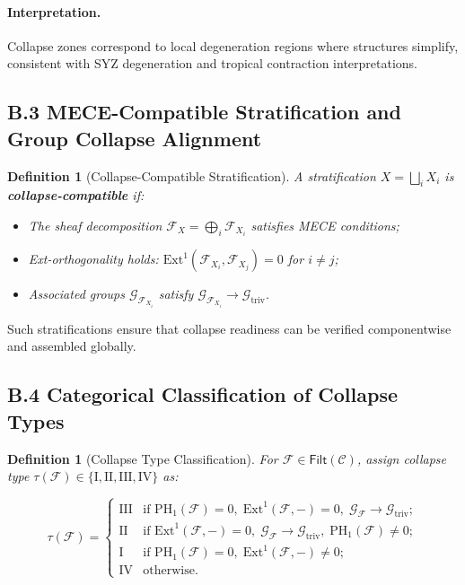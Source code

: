 \documentclass[11pt]{article}
\newtheorem{definition}[theorem]{Definition}
\begin{document}
\paragraph{Interpretation.}
Collapse zones correspond to local degeneration regions where structures simplify, consistent with SYZ degeneration and tropical contraction interpretations.

\subsection*{B.3 MECE-Compatible Stratification and Group Collapse Alignment}

\begin{definition}[Collapse-Compatible Stratification]
A stratification \( X = \bigsqcup_i X_i \) is \textbf{collapse-compatible} if:

\begin{itemize}
    \item The sheaf decomposition \( \mathcal{F}_X = \bigoplus_i \mathcal{F}_{X_i} \) satisfies MECE conditions;
    \item Ext-orthogonality holds: \( \mathrm{Ext}^1(\mathcal{F}_{X_i}, \mathcal{F}_{X_j}) = 0 \) for \( i \neq j \);
    \item Associated groups \( \mathcal{G}_{\mathcal{F}_{X_i}} \) satisfy \( \mathcal{G}_{\mathcal{F}_{X_i}} \longrightarrow \mathcal{G}_{\mathrm{triv}} \).
\end{itemize}
\end{definition}

Such stratifications ensure that collapse readiness can be verified componentwise and assembled globally.

\subsection*{B.4 Categorical Classification of Collapse Types}

\begin{definition}[Collapse Type Classification]
For \( \mathcal{F} \in \mathsf{Filt}(\mathcal{C}) \), assign collapse type \( \tau(\mathcal{F}) \in \{\mathrm{I}, \mathrm{II}, \mathrm{III}, \mathrm{IV}\} \) as:

\[
\tau(\mathcal{F}) =
\begin{cases}
\mathrm{III} & \text{if } \mathrm{PH}_1(\mathcal{F}) = 0, \; \mathrm{Ext}^1(\mathcal{F}, -) = 0, \; \mathcal{G}_{\mathcal{F}} \longrightarrow \mathcal{G}_{\mathrm{triv}}; \\
\mathrm{II}  & \text{if } \mathrm{Ext}^1(\mathcal{F}, -) = 0, \; \mathcal{G}_{\mathcal{F}} \longrightarrow \mathcal{G}_{\mathrm{triv}}, \; \mathrm{PH}_1(\mathcal{F}) \neq 0; \\
\mathrm{I}   & \text{if } \mathrm{PH}_1(\mathcal{F}) = 0, \; \mathrm{Ext}^1(\mathcal{F}, -) \neq 0; \\
\mathrm{IV}  & \text{otherwise}.
\end{cases}
\]
\end{definition}
\end{document}
